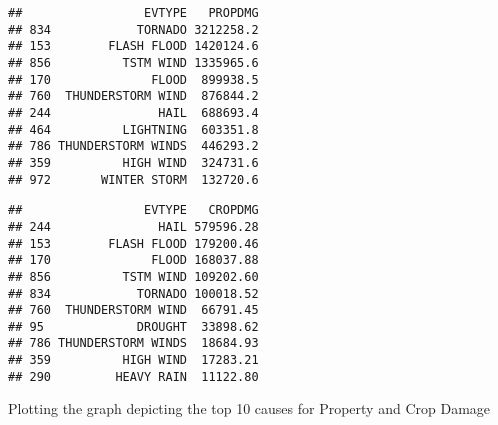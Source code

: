 \documentclass[
]{article}
\newenvironment{Shaded}{\begin{snugshade}}{\end{snugshade}}
\newcommand{\AttributeTok}[1]{\textcolor[rgb]{0.13,0.29,0.53}{#1}}
\newcommand{\CommentTok}[1]{\textcolor[rgb]{0.56,0.35,0.01}{\textit{#1}}}
\newcommand{\ConstantTok}[1]{\textcolor[rgb]{0.56,0.35,0.01}{#1}}
\newcommand{\DecValTok}[1]{\textcolor[rgb]{0.00,0.00,0.81}{#1}}
\newcommand{\FunctionTok}[1]{\textcolor[rgb]{0.13,0.29,0.53}{\textbf{#1}}}
\newcommand{\NormalTok}[1]{#1}
\newcommand{\OtherTok}[1]{\textcolor[rgb]{0.56,0.35,0.01}{#1}}
\newcommand{\SpecialCharTok}[1]{\textcolor[rgb]{0.81,0.36,0.00}{\textbf{#1}}}
\begin{document}
\begin{verbatim}
##                 EVTYPE   PROPDMG
## 834            TORNADO 3212258.2
## 153        FLASH FLOOD 1420124.6
## 856          TSTM WIND 1335965.6
## 170              FLOOD  899938.5
## 760  THUNDERSTORM WIND  876844.2
## 244               HAIL  688693.4
## 464          LIGHTNING  603351.8
## 786 THUNDERSTORM WINDS  446293.2
## 359          HIGH WIND  324731.6
## 972       WINTER STORM  132720.6
\end{verbatim}

\begin{Shaded}
\end{Shaded}

\begin{verbatim}
##                 EVTYPE   CROPDMG
## 244               HAIL 579596.28
## 153        FLASH FLOOD 179200.46
## 170              FLOOD 168037.88
## 856          TSTM WIND 109202.60
## 834            TORNADO 100018.52
## 760  THUNDERSTORM WIND  66791.45
## 95             DROUGHT  33898.62
## 786 THUNDERSTORM WINDS  18684.93
## 359          HIGH WIND  17283.21
## 290         HEAVY RAIN  11122.80
\end{verbatim}

Plotting the graph depicting the top 10 causes for Property and Crop
Damage
\end{document}
